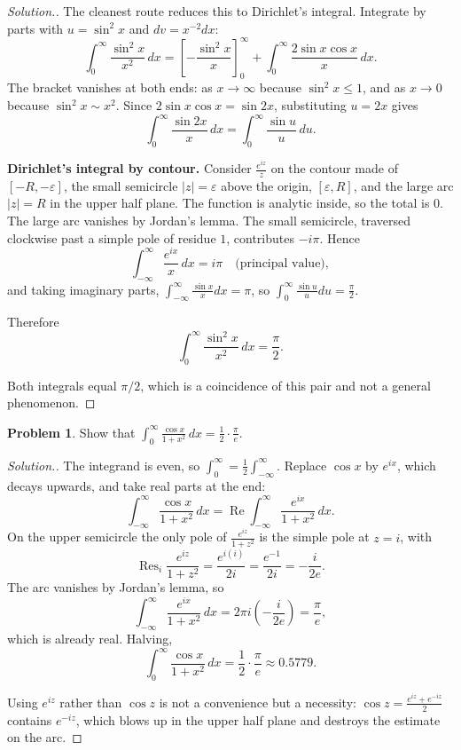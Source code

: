 \documentclass[11pt,a4paper]{article}
\theoremstyle{definition}
\newtheorem{problemx}{Problem}[section]
\newenvironment{problem}{\begin{problemx}}{\end{problemx}}
\newenvironment{solution}
  {\renewcommand{\qedsymbol}{}\begin{proof}[\textit{Solution}.]}
  {\end{proof}}
\begin{document}
\begin{solution}
The cleanest route reduces this to Dirichlet's integral. Integrate by parts with
$u = \sin^2 x$ and $dv = x^{-2}dx$:
$$\int^{\infty}_{0}\frac{\sin^2 x}{x^2}\,dx
= \left[-\frac{\sin^2 x}{x}\right]^{\infty}_{0}
+ \int^{\infty}_{0}\frac{2\sin x\cos x}{x}\,dx .$$
The bracket vanishes at both ends: as $x \rightarrow \infty$ because
$\sin^2 x \leq 1$, and as $x \rightarrow 0$ because $\sin^2 x \sim x^2$. Since
$2\sin x\cos x = \sin 2x$, substituting $u = 2x$ gives
$$\int^{\infty}_{0}\frac{\sin 2x}{x}\,dx
= \int^{\infty}_{0}\frac{\sin u}{u}\,du .$$

\textbf{Dirichlet's integral by contour.} Consider $\frac{e^{iz}}{z}$ on the
contour made of $[-R,-\varepsilon]$, the small semicircle
$\left|z\right| = \varepsilon$ above the origin, $[\varepsilon, R]$, and the large
arc $\left|z\right| = R$ in the upper half plane. The function is analytic inside,
so the total is $0$. The large arc vanishes by Jordan's lemma. The small
semicircle, traversed clockwise past a simple pole of residue $1$, contributes
$-i\pi$. Hence
$$\int^{\infty}_{-\infty}\frac{e^{ix}}{x}\,dx = i\pi
\quad\text{(principal value)},$$
and taking imaginary parts,
$\displaystyle\int^{\infty}_{-\infty}\frac{\sin x}{x}dx = \pi$, so
$\displaystyle\int^{\infty}_{0}\frac{\sin u}{u}du = \frac{\pi}{2}$.

Therefore
$$\boxed{\int^{\infty}_{0}\frac{\sin^2 x}{x^2}\,dx = \frac{\pi}{2}.}$$

Both integrals equal $\pi/2$, which is a coincidence of this pair and not a
general phenomenon.
\end{solution}


\begin{problem}
Show that
$\displaystyle\int^{\infty}_{0}\frac{\cos x}{1 + x^{2}}\,dx
= \frac{1}{2}\cdot\frac{\pi}{e}$.
\end{problem}

\begin{solution}
The integrand is even, so $\int^{\infty}_{0} = \tfrac12\int^{\infty}_{-\infty}$.
Replace $\cos x$ by $e^{ix}$, which decays upwards, and take real parts at the
end:
$$\int^{\infty}_{-\infty}\frac{\cos x}{1+x^2}\,dx
= \operatorname{Re}\int^{\infty}_{-\infty}\frac{e^{ix}}{1+x^2}\,dx .$$
On the upper semicircle the only pole of $\frac{e^{iz}}{1+z^2}$ is the simple
pole at $z = i$, with
$$\operatorname{Res}_{i}\frac{e^{iz}}{1+z^2}
= \frac{e^{i(i)}}{2i} = \frac{e^{-1}}{2i} = -\frac{i}{2e}.$$
The arc vanishes by Jordan's lemma, so
$$\int^{\infty}_{-\infty}\frac{e^{ix}}{1+x^2}\,dx
= 2\pi i\left(-\frac{i}{2e}\right) = \frac{\pi}{e},$$
which is already real. Halving,
$$\boxed{\int^{\infty}_{0}\frac{\cos x}{1+x^2}\,dx
= \frac{1}{2}\cdot\frac{\pi}{e} \approx 0.5779 .}$$

Using $e^{iz}$ rather than $\cos z$ is not a convenience but a necessity:
$\cos z = \frac{e^{iz}+e^{-iz}}{2}$ contains $e^{-iz}$, which blows up in the
upper half plane and destroys the estimate on the arc.
\end{solution}
\end{document}
